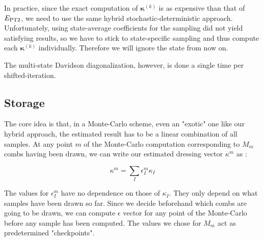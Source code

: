 \documentclass[./thesis.tex]{subfiles}
\begin{document}
In practice, since the exact computation of ${\pmb \kappa}^{(k)}$ is as expensive than that of $E_\text{PT2}$, we need to use the same hybrid stochastic-deterministic approach. Unfortunately, using state-average coefficients for the sampling did not yield satisfying results, so we have to stick to state-specific sampling and thus compute each ${\pmb \kappa}^{(k)}$ individually. Therefore we will ignore the state from now on.

The multi-state Davidson diagonalization, however, is done a single time per shifted-\Bk iteration.


\subsection{Storage}

The core idea is that, in a Monte-Carlo scheme, even an "exotic" one like our hybrid approach, the estimated result has to be a linear combination of all samples. At any point $m$ of the Monte-Carlo computation corresponding to $M_m$ combs having been drawn, we can write our estimated dressing vector $\kappa^m$ as :


\begin{equation}
\kappa^m = \sum_{I} \epsilon^m_{I} \kappa_I
\end{equation}


The values for $\epsilon^m_I$ have no dependence on those of $\kappa_I$. They only depend on what samples have been drawn so far. Since we decide beforehand which combs are going to be drawn, we can compute $\epsilon$ vector for any point of the Monte-Carlo before any sample has been computed. The values we chose for $M_m$ act as predetermined "checkpoints".

\end{document}
